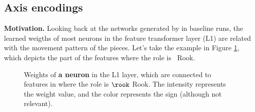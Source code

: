\subsection{Axis encodings}
\label{sec:axis_encoding}

\textbf{Motivation.} Looking back at the networks generated by  in baseline runs, the learned weigths of most neurons in the feature transformer layer (L1) are related with the movement pattern of the pieces. Let's take the example in Figure \ref{fig:rook_weights}, which depicts the  part of the features where the role is \symrook\ Rook.

\begin{figure}[h]
\centering
{}%
\qquad
{}%
\caption{Weights of \textbf{a neuron} in the L1 layer, which are connected to features in  where the role is $\rook$ Rook. The intensity represents the weight value, and the color represents the sign (although not relevant).}
\label{fig:rook_weights}
\end{figure}

